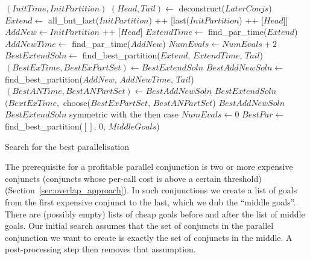 \begin{algorithm}[tbp]
\begin{algorithmic}[1]
    \State \Return $(InitTime, InitPartition)$
  \Else
    \State $(Head, Tail) \gets$ deconstruct($LaterConjs$)
    \State $Extend \gets$ all\_but\_last($InitPartition$) ++
        [last($InitPartition$) ++ [$Head$]]
    \State $AddNew \gets InitPartition$ ++ [$Head$]
    \State $ExtendTime \gets$ find\_par\_time($Extend$)
    \State $AddNewTime \gets$ find\_par\_time($AddNew$)
    \State $NumEvals \gets NumEvals + 2$
      \State $BestExtendSoln \gets$ find\_best\_partition($Extend$,
        $ExtendTime$, $Tail$)
      \State $(BestExTime, BestExPartSet) \gets BestExtendSoln$
        \State $BestAddNewSoln \gets$ find\_best\_partition($AddNew$,
            $AddNewTime$, $Tail$)
        \State $(BestANTime, BestANPartSet) \gets BestAddNewSoln$
          \State \Return $BestExtendSoln$
          \State \Return $(BextExTime,$ choose($BestExPartSet$,
            $BestANPartSet$)
        \Else
          \State \Return $BestAddNewSoln$
        \EndIf
      \Else
        \State \Return $BestExtendSoln$
      \EndIf
    \Else
      \State symmetric with the then case
    \EndIf
  \EndIf
\EndProcedure
\State
\State $NumEvals \gets 0$
\State $BestPar \gets$ find\_best\_partition($[]$, 0, $MiddleGoals$)
\end{algorithmic}
\caption{Search for the best parallelisation}
\label{alg:best_par_search}
\end{algorithm}

The prerequisite for a profitable parallel conjunction is two or more
expensive conjuncts (conjuncts whose per-call cost is above a certain
threshold)
(Section~\ref{sec:overlap_approach}).
In such conjunctions we create a list of goals from the first expensive
conjunct to the last,
which we dub the ``middle goals''.
There are (possibly empty) lists of cheap goals before and after the 
list of middle goals.
Our initial search assumes that
the set of conjuncts in the parallel conjunction we want to create
is exactly the set of conjuncts in the middle.
A post-processing step then removes that assumption.

